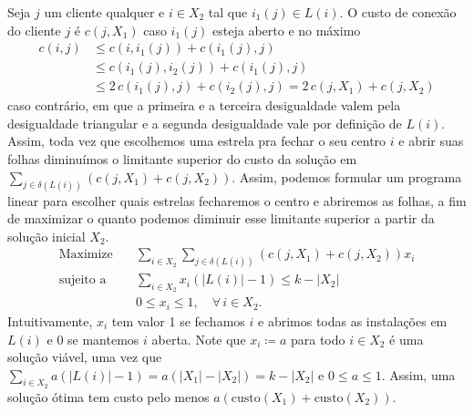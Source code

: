 Seja $j$ um cliente qualquer e $i \in X_2$ tal que $i_1(j) \in L(i)$. O custo de conexão do cliente $j$ é $c(j,X_1)$ caso $i_1(j)$ esteja aberto e no máximo 
\begin{align}
    c(i,j) &\leq c(i,i_1(j)) + c(i_1(j),j) \nonumber \\
    &\leq c(i_1(j),i_2(j)) +  c(i_1(j),j) \nonumber \\
    &\leq 2\,c(i_1(j),j) + c(i_2(j),j) = 2\,c(j,X_1) + c(j,X_2)\nonumber
\end{align}
caso contrário, em que a primeira e a terceira desigualdade valem pela desigualdade triangular e a segunda desigualdade vale por definição de $L(i)$. Assim, toda vez que escolhemos uma estrela pra fechar o seu centro $i$  e abrir suas folhas diminuímos o limitante superior do custo da solução em $\sum_{j \in \delta(L(i))}(c(j,X_1) + c(j,X_2))$. Assim, podemos formular um programa linear para escolher quais estrelas fecharemos o centro e abriremos as folhas, a fim de maximizar o quanto podemos diminuir esse limitante superior a partir da solução inicial $X_2$.
\begin{align}
\text{Maximize} \quad &\sum_{i \in X_2} \sum_{j\in \delta(L(i))} (c(j,X_1) + c(j,X_2))x_i \nonumber\\
\text{sujeito a}\quad & \sum_{i \in X_2} x_i(|L(i)| - 1) \leq k - |X_2| \nonumber \\
&0 \leq x_i \leq 1, \quad \forall\, i \in X_2 \nonumber.
\end{align}
Intuitivamente, $x_i$ tem valor 1 se fechamos $i$ e abrimos todas as instalações em $L(i)$ e 0 se mantemos $i$ aberta. Note que $x_i \coloneqq a$ para todo $i \in X_2$ é uma solução viável, uma vez que $\sum_{i \in X_2} a(|L(i)| - 1) = a(|X_1| - |X_2|) = k - |X_2|$ e $ 0 \leq a \leq 1$. Assim, uma solução ótima tem custo pelo menos $a(\text{custo}(X_1) + \text{custo}(X_2))$.

